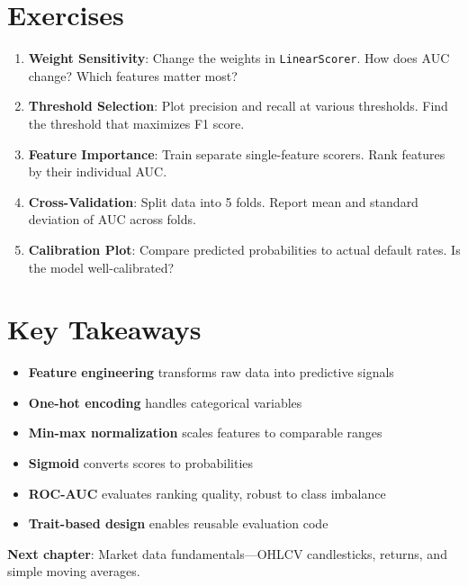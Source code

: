 \section{Exercises}

\begin{enumerate}
    \item \textbf{Weight Sensitivity}: Change the weights in \texttt{LinearScorer}. How does AUC change? Which features matter most?

    \item \textbf{Threshold Selection}: Plot precision and recall at various thresholds. Find the threshold that maximizes F1 score.

    \item \textbf{Feature Importance}: Train separate single-feature scorers. Rank features by their individual AUC.

    \item \textbf{Cross-Validation}: Split data into 5 folds. Report mean and standard deviation of AUC across folds.

    \item \textbf{Calibration Plot}: Compare predicted probabilities to actual default rates. Is the model well-calibrated?
\end{enumerate}

\section{Key Takeaways}

\begin{itemize}
    \item \textbf{Feature engineering} transforms raw data into predictive signals
    \item \textbf{One-hot encoding} handles categorical variables
    \item \textbf{Min-max normalization} scales features to comparable ranges
    \item \textbf{Sigmoid} converts scores to probabilities
    \item \textbf{ROC-AUC} evaluates ranking quality, robust to class imbalance
    \item \textbf{Trait-based design} enables reusable evaluation code
\end{itemize}

\vspace{1em}
\noindent\textbf{Next chapter}: Market data fundamentals---OHLCV candlesticks, returns, and simple moving averages.
